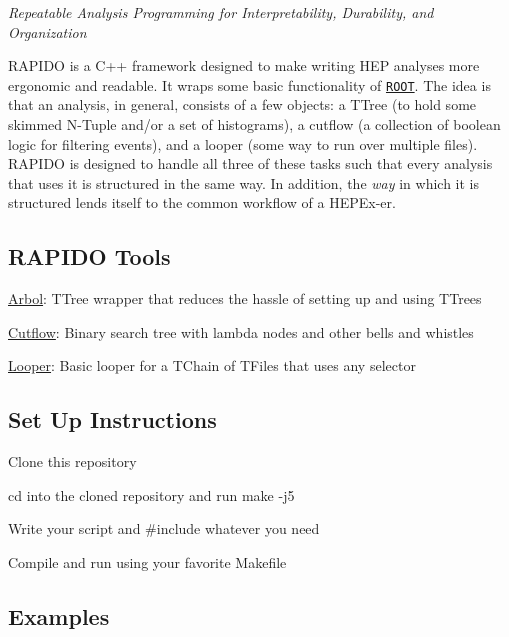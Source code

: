{\itshape Repeatable Analysis Programming for Interpretability, Durability, and Organization}

R\+A\+P\+I\+DO is a C++ framework designed to make writing H\+EP analyses more ergonomic and readable. It wraps some basic functionality of \href{https://root.cern/}{\tt R\+O\+OT}. The idea is that an analysis, in general, consists of a few objects\+: a T\+Tree (to hold some skimmed N-\/\+Tuple and/or a set of histograms), a cutflow (a collection of boolean logic for filtering events), and a looper (some way to run over multiple files). R\+A\+P\+I\+DO is designed to handle all three of these tasks such that every analysis that uses it is structured in the same way. In addition, the {\itshape way} in which it is structured lends itself to the common workflow of a H\+E\+P\+Ex-\/er.

\subsection*{R\+A\+P\+I\+DO Tools}


\begin{DoxyEnumerate}
\item \hyperlink{classArbol}{Arbol}\+: T\+Tree wrapper that reduces the hassle of setting up and using T\+Trees
\item \hyperlink{classCutflow}{Cutflow}\+: Binary search tree with lambda nodes and other bells and whistles
\item \hyperlink{classLooper}{Looper}\+: Basic looper for a T\+Chain of T\+Files that uses any selector
\end{DoxyEnumerate}

\subsection*{Set Up Instructions}


\begin{DoxyEnumerate}
\item Clone this repository
\item {\ttfamily cd} into the cloned repository and run {\ttfamily make -\/j5}
\item Write your script and {\ttfamily \#include} whatever you need
\item Compile and run using your favorite {\ttfamily Makefile}
\end{DoxyEnumerate}

\subsection*{Examples}


